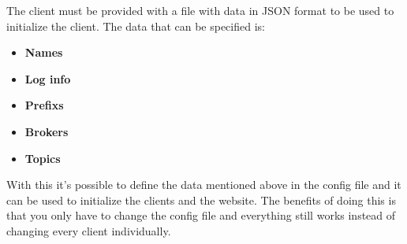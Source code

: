 The client must be provided with a file with data in JSON format to be used to initialize the client. The data that can be specified is:
\small{
\begin{itemize} [noitemsep, nolistsep]
	\item \textbf {Names}
	\item \textbf {Log info}
	\item \textbf {Prefixs}
	\item \textbf {Brokers}
	\item \textbf {Topics\\}
\end{itemize}
}
With this it's possible to define the data mentioned above in the config file and it can be used to initialize the clients and the website. The benefits of doing this is that you only have to change the config file and everything still works instead of changing every client individually.

